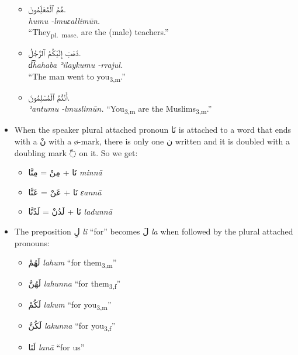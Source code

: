\documentclass[
  10pt,
]{book}
\providecommand{\tightlist}{%
  \setlength{\itemsep}{0pt}\setlength{\parskip}{0pt}}
\begin{document}
\begin{itemize}
  \begin{itemize}
  \tightlist
  \item
    \foreignlanguage{arabic}{هُمُ ٱلْمُعَلِّمُونَ.}\\
    \emph{humu -lmuɛallimūn.}\\
    \enquote{They\textsubscript{pl.~masc.} are the (male) teachers.}
  \item
    \foreignlanguage{arabic}{ذَهَبَ إِلَيْکُمُ ٱلرَّجُلُ.}\\
    \emph{d͡hahaba ʾilaykumu -rrajul.}\\
    \enquote{The man went to you\textsubscript{3,m}.}
  \item
    \foreignlanguage{arabic}{أَنْتُمُ ٱلْمُسْلِمُونَ.}\\
    \emph{ʾantumu -lmuslimūn.}
    \enquote{You\textsubscript{3,m} are the Muslims\textsubscript{3,m}.}
  \end{itemize}
\item
  When the speaker plural attached pronoun \foreignlanguage{arabic}{نَا} is attached to a word that ends with a \foreignlanguage{arabic}{نْ} with a ø-mark, there is only one \foreignlanguage{arabic}{ن} written and it is doubled with a doubling mark \foreignlanguage{arabic}{◌ّ} on it. So we get:

  \begin{itemize}
  \tightlist
  \item
    \foreignlanguage{arabic}{نَا} + \foreignlanguage{arabic}{مِنْ} = \foreignlanguage{arabic}{مِنَّا} \emph{minnā}
  \item
    \foreignlanguage{arabic}{نَا} + \foreignlanguage{arabic}{عَنْ} = \foreignlanguage{arabic}{عَنَّا} \emph{ɛannā}
  \item
    \foreignlanguage{arabic}{نَا} + \foreignlanguage{arabic}{لَدُنْ} = \foreignlanguage{arabic}{لَدُنَّا} \emph{ladunnā}
  \end{itemize}
\item
  The preposition \foreignlanguage{arabic}{لِ} \emph{li} \enquote{for} becomes \foreignlanguage{arabic}{لَ} \emph{la} when followed by the plural attached pronouns:

  \begin{itemize}
  \tightlist
  \item
    \foreignlanguage{arabic}{لَهُمْ} \emph{lahum} \enquote{for them\textsubscript{3,m}}
  \item
    \foreignlanguage{arabic}{لَهُنَّ} \emph{lahunna} \enquote{for them\textsubscript{3,f}}
  \item
    \foreignlanguage{arabic}{لَکُمْ} \emph{lakum} \enquote{for you\textsubscript{3,m}}
  \item
    \foreignlanguage{arabic}{لَکُنَّ} \emph{lakunna} \enquote{for you\textsubscript{3,f}}
  \item
    \foreignlanguage{arabic}{لَنَا} \emph{lanā} \enquote{for us}
  \end{itemize}
\end{itemize}
\end{document}

